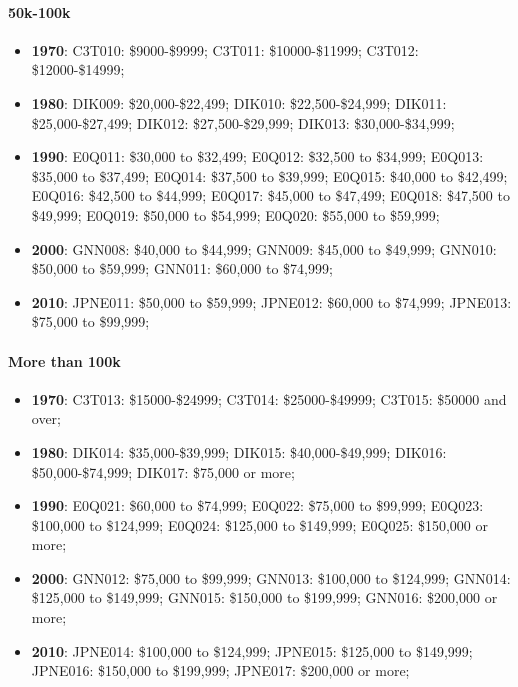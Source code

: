 \documentclass[a4paper]{article}
\begin{document}
\paragraph{50k-100k}
\begin{itemize}
   \item{\textbf{1970}:  C3T010: \$9000-\$9999; C3T011: \$10000-\$11999; C3T012: \$12000-\$14999;}
   \item{\textbf{1980}:  DIK009: \$20,000-\$22,499; DIK010: \$22,500-\$24,999; DIK011: \$25,000-\$27,499; DIK012: \$27,500-\$29,999; DIK013: \$30,000-\$34,999;}
   \item{\textbf{1990}:  E0Q011: \$30,000 to \$32,499; E0Q012: \$32,500 to \$34,999; E0Q013: \$35,000 to \$37,499; E0Q014: \$37,500 to \$39,999; E0Q015: \$40,000 to \$42,499; E0Q016: \$42,500 to \$44,999; E0Q017: \$45,000 to \$47,499; E0Q018: \$47,500 to \$49,999; E0Q019: \$50,000 to \$54,999; E0Q020: \$55,000 to \$59,999;}
   \item{\textbf{2000}:  GNN008: \$40,000 to \$44,999; GNN009: \$45,000 to \$49,999; GNN010: \$50,000 to \$59,999; GNN011: \$60,000 to \$74,999;}
   \item{\textbf{2010}:  JPNE011: \$50,000 to \$59,999; JPNE012: \$60,000 to \$74,999; JPNE013: \$75,000 to \$99,999;}
\end{itemize}

\paragraph{More than 100k}
\begin{itemize}
   \item{\textbf{1970}:  C3T013: \$15000-\$24999; C3T014: \$25000-\$49999; C3T015: \$50000 and over;}
   \item{\textbf{1980}:  DIK014: \$35,000-\$39,999; DIK015: \$40,000-\$49,999; DIK016: \$50,000-\$74,999; DIK017: \$75,000 or more;}
   \item{\textbf{1990}:  E0Q021: \$60,000 to \$74,999; E0Q022: \$75,000 to \$99,999; E0Q023: \$100,000 to \$124,999; E0Q024: \$125,000 to \$149,999; E0Q025: \$150,000 or more;}
   \item{\textbf{2000}:  GNN012: \$75,000 to \$99,999; GNN013: \$100,000 to \$124,999; GNN014: \$125,000 to \$149,999; GNN015: \$150,000 to \$199,999; GNN016: \$200,000 or more;}
   \item{\textbf{2010}:  JPNE014: \$100,000 to \$124,999; JPNE015: \$125,000 to \$149,999; JPNE016: \$150,000 to \$199,999; JPNE017: \$200,000 or more;}
\end{itemize}
\end{document}
